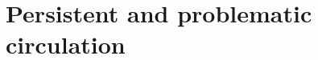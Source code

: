 \documentclass{nature}
\begin{document}
\section{Persistent and problematic circulation}
\end{document}
